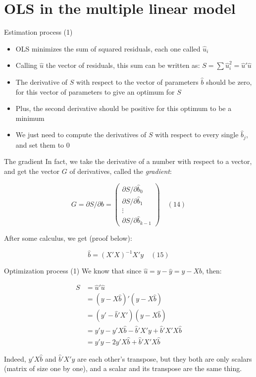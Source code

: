 \documentclass[aspectratio=169]{beamer}
\begin{document}
\section{OLS in the multiple linear model}

\begin{frame}{Estimation process (1)}
\begin{itemize}
    \item OLS minimizes the sum of squared residuals, each one called $\hat{u}_i$
    \item Calling $\hat{u}$ the vector of residuals, this sum can be written as: $S = \sum \hat{u}_i^2 = \hat{u}'\hat{u}$
    \item The derivative of $S$ with respect to the vector of parameters $\hat{b}$ should be zero, for this vector of parameters to give an optimum for $S$
    \item Plus, the second derivative should be positive for this optimum to be a minimum
    \item We just need to compute the derivatives of $S$ with respect to every single $\hat{b}_j$, and set them to 0
\end{itemize}
\end{frame}

\begin{frame}{The gradient}
In fact, we take the derivative of a number with respect to a vector, and get the vector $G$ of derivatives, called the \textit{gradient}:

\[G = \partial S/\partial \hat{b} = \begin{pmatrix} \partial S/\partial\hat{b}_0 \\ \partial S/\partial\hat{b}_1 \\ \vdots \\ \partial S/\partial\hat{b}_{k-1} \end{pmatrix} \quad (14)\]

After some calculus, we get (proof below):

\[\hat{b} = (X'X)^{-1}X'y \quad (15)\]
\end{frame}

\begin{frame}{Optimization process (1)}
We know that since $\hat{u} = y - \hat{y} = y - X\hat{b}$, then:

\begin{align*}
S &= \hat{u}'\hat{u}\\
&= (y - X\hat{b})'(y - X\hat{b})\\
&= (y' - \hat{b}'X')(y - X\hat{b})\\
&= y'y - y'X\hat{b} - \hat{b}'X'y + \hat{b}'X'X\hat{b}\\
&= y'y - 2y'X\hat{b} + \hat{b}'X'X\hat{b}
\end{align*}

Indeed, $y'X\hat{b}$ and $\hat{b}'X'y$ are each other's transpose, but they both are only scalars (matrix of size one by one), and a scalar and its transpose are the same thing.
\end{frame}
\end{document}
